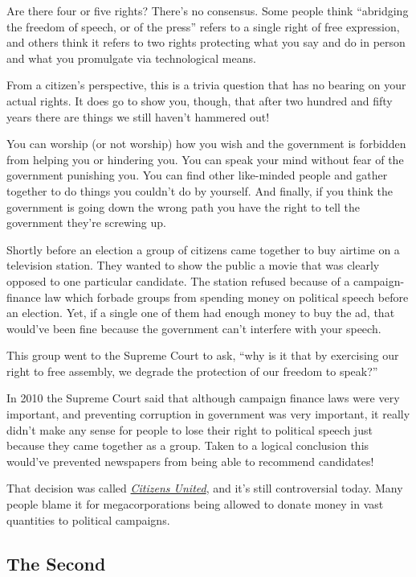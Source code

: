 \documentclass[10pt]{article}
\begin{document}
Are there four or five rights?  There's no consensus.  Some people think ``abridging the freedom of speech, or of the press'' refers to a single right of free expression, and others think it refers to two rights protecting what you say and do in person and what you promulgate via technological means.

From a citizen's perspective, this is a trivia question that has no bearing on your actual rights.  It does go to show you, though, that after two hundred and fifty years there are things we still haven't hammered out!

You can worship (or not worship) how you wish and the government is forbidden from helping you or hindering you.  You can speak your mind without fear of the government punishing you.  You can find other like-minded people and gather together to do things you couldn't do by yourself.  And finally, if you think the government is going down the wrong path you have the right to tell the government they're screwing up.

Shortly before an election a group of citizens came together to buy airtime on a television station.  They wanted to show the public a movie that was clearly opposed to one particular candidate.  The station refused because of a campaign-finance law which forbade groups from spending money on political speech before an election.  Yet, if a single one of them had enough money to buy the ad, that would've been fine because the government can't interfere with your speech.

This group went to the Supreme Court to ask, ``why is it that by exercising our right to free assembly, we degrade the protection of our freedom to speak?''

In 2010 the Supreme Court said that although campaign finance laws were very important, and preventing corruption in government was very important, it really didn't make any sense for people to lose their right to political speech just because they came together as a group.  Taken to a logical conclusion this would've prevented newspapers from being able to recommend candidates!

That decision was called \href{https://supreme.justia.com/cases/federal/us/558/310/}{\it Citizens United}, and it's still controversial today.  Many people blame it for megacorporations being allowed to donate money in vast quantities to political campaigns.

\subsection{The Second}
\end{document}
